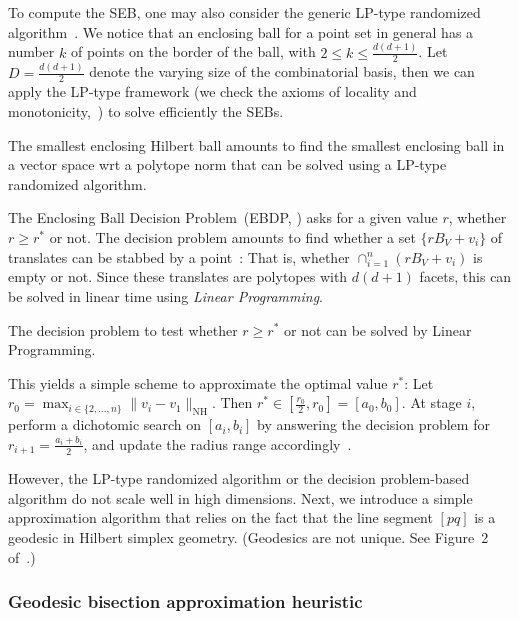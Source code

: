 \documentclass[graybox]{svmult}
\def\NH{\mathrm{NH}}  %
\begin{document}
To compute the SEB, one may also consider the generic LP-type randomized algorithm~\cite{SEBB-2008}.
We notice that an enclosing ball for a point set in general has
a number $k$ of points on the border of the ball, with $2\leq k\leq \frac{d(d+1)}{2}$.
Let $D=\frac{d(d+1)}{2}$ denote the varying size of the combinatorial basis,
then we can apply the LP-type framework (we check the axioms of locality and monotonicity,~\cite{LPtype-1992})
to solve efficiently the SEBs. 

\begin{theorem}
The smallest enclosing Hilbert ball amounts to find the smallest enclosing ball in a vector space
wrt a polytope norm that can be solved using a LP-type randomized algorithm.
\end{theorem}

The Enclosing Ball Decision Problem~(EBDP, \cite{BallML-2009}) asks for a given value $r$, whether $r\geq r^*$ or not.
The decision problem amounts to find whether a set $\{rB_V+v_i\}$ of translates can be stabbed by a point~\cite{BallML-2009}:
That is, whether $\cap_{i=1}^n (rB_V+v_i)$ is empty or not. Since these translates are polytopes with $d(d+1)$ facets,
this can be solved in linear time using {\em Linear Programming}.

\begin{theorem}
The decision problem to test whether $r\geq r^*$ or not can be solved by Linear Programming.
\end{theorem}

This yields a simple scheme to approximate the optimal value $r^*$: 
Let $r_0=\max_{i\in\{2,\ldots,n\}} \|v_i-v_1\|_\NH$. Then $r^*\in[\frac{r_0}{2},r_0]=[a_0,b_0]$.
At stage $i$, perform a dichotomic search on $[a_i,b_i]$ by answering the decision problem for
$r_{i+1}=\frac{a_i+b_i}{2}$, and update the radius range accordingly~\cite{BallML-2009}.
 
However, the LP-type randomized algorithm or the decision problem-based algorithm do not scale well in high dimensions.
Next, we introduce a simple approximation algorithm that relies on the fact that the line segment $[pq]$ is a geodesic in Hilbert simplex geometry.
(Geodesics are not unique. See Figure~2 of~\cite{HilbertHarpe-1991}.)

\subsubsection{Geodesic bisection approximation heuristic\label{sec:BCHSG}} 
\end{document}
